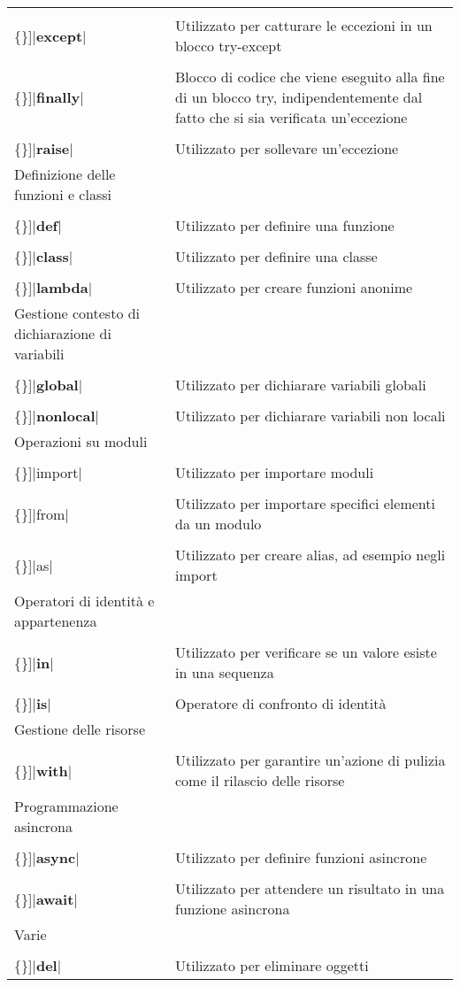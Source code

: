 \documentclass[
  letterpaper,
]{scrbook}
\newcommand{\VERB}{\Verb[commandchars=\\\{\}]}
\newcommand{\ControlFlowTok}[1]{\textcolor[rgb]{0.00,0.23,0.31}{\textbf{#1}}}
\newcommand{\ImportTok}[1]{\textcolor[rgb]{0.00,0.46,0.62}{#1}}
\newcommand{\KeywordTok}[1]{\textcolor[rgb]{0.00,0.23,0.31}{\textbf{#1}}}
\begin{document}
\begin{longtable}[]{@{}
  >{\raggedright\arraybackslash}p{}
  >{\raggedright\arraybackslash}p{}@{}}
\VERB|\ControlFlowTok{except}| & Utilizzato per catturare le eccezioni
in un blocco try-except \\
\VERB|\ControlFlowTok{finally}| & Blocco di codice che viene eseguito
alla fine di un blocco try, indipendentemente dal fatto che si sia
verificata un'eccezione \\
\VERB|\ControlFlowTok{raise}| & Utilizzato per sollevare un'eccezione \\
Definizione delle funzioni e classi & \\
\VERB|\KeywordTok{def}| & Utilizzato per definire una funzione \\
\VERB|\KeywordTok{class}| & Utilizzato per definire una classe \\
\VERB|\KeywordTok{lambda}| & Utilizzato per creare funzioni anonime \\
Gestione contesto di dichiarazione di variabili & \\
\VERB|\KeywordTok{global}| & Utilizzato per dichiarare variabili
globali \\
\VERB|\KeywordTok{nonlocal}| & Utilizzato per dichiarare variabili non
locali \\
Operazioni su moduli & \\
\VERB|\ImportTok{import}| & Utilizzato per importare moduli \\
\VERB|\ImportTok{from}| & Utilizzato per importare specifici elementi da
un modulo \\
\VERB|\ImportTok{as}| & Utilizzato per creare alias, ad esempio negli
import \\
Operatori di identità e appartenenza & \\
\VERB|\KeywordTok{in}| & Utilizzato per verificare se un valore esiste
in una sequenza \\
\VERB|\KeywordTok{is}| & Operatore di confronto di identità \\
Gestione delle risorse & \\
\VERB|\ControlFlowTok{with}| & Utilizzato per garantire un'azione di
pulizia come il rilascio delle risorse \\
Programmazione asincrona & \\
\VERB|\ControlFlowTok{async}| & Utilizzato per definire funzioni
asincrone \\
\VERB|\ControlFlowTok{await}| & Utilizzato per attendere un risultato in
una funzione asincrona \\
Varie & \\
\VERB|\KeywordTok{del}| & Utilizzato per eliminare oggetti \\

\end{longtable}
\end{document}
